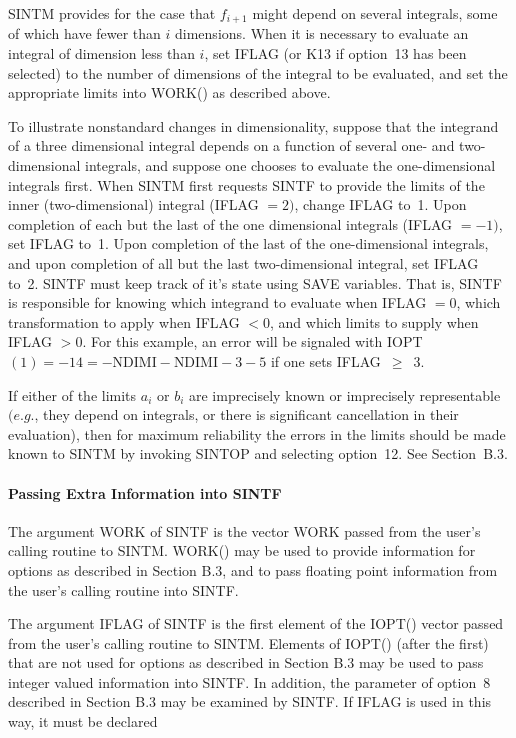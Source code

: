 \documentclass[twoside]{MATH77}
\begin{document}
SINTM provides for the case that $f_{i+1}$ might depend on several
integrals, some of which have fewer than $i$ dimensions. When it is
necessary to evaluate an integral of dimension less than $i$, set IFLAG (or
K13 if option~13 has been selected) to the number of dimensions of the
integral to be evaluated, and set the appropriate limits into WORK() as
described above.

To illustrate nonstandard changes in dimensionality, suppose that the
integrand of a three dimensional integral depends on a function of several
one- and two-dimensional integrals, and suppose one chooses to evaluate the
one-dimensional integrals first. When SINTM first requests SINTF to provide
the limits of the inner (two-dimensional) integral (IFLAG $= 2)$, change
IFLAG to~1. Upon completion of each but the last of the one dimensional
integrals (IFLAG $= -1)$, set IFLAG to~1. Upon completion of the last of the
one-dimensional integrals, and upon completion of all but the last
two-dimensional integral, set IFLAG to~2. SINTF must keep track of it's
state using SAVE variables. That is, SINTF is responsible for knowing which
integrand to evaluate when IFLAG $= 0$, which transformation to apply when
IFLAG $< 0$, and which limits to supply when IFLAG $> 0$. For this
example, an error will be signaled with IOPT$(1)=-14=-\text{NDIMI}-
\text{NDIMI}-3-5$ if one sets IFLAG~$\geq $~3.

If either of the limits $a_i$ or $b_i$ are imprecisely known or imprecisely
representable $(e.g.$, they depend on integrals, or there is significant
cancellation in their evaluation), then for maximum reliability the errors
in the limits should be made known to SINTM by invoking SINTOP and selecting
option~12. See Section~B.3.

\paragraph{Passing Extra Information into SINTF\label{ExtSINTF}}

The argument WORK of SINTF is the vector WORK passed from the user's calling
routine to SINTM.  WORK() may be used to provide information for options as
described in Section B.3, and to pass floating point information from the
user's calling routine into SINTF.

The argument IFLAG of SINTF is the first element of the IOPT() vector
passed from the user's calling routine to SINTM. Elements of IOPT()
(after the first) that are not used for options as described in
Section B.3 may be used to pass integer valued information into
SINTF. In addition, the parameter of option~8 described in Section
B.3 may be examined by SINTF. If IFLAG is used in this way, it must
be declared
\end{document}
